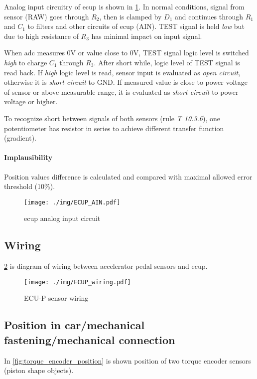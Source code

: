 Analog input circuitry of \gls{ecup} is shown in \ref{fig:ecup_analog_input}. In normal conditions, signal from sensor (RAW) goes through $R_2$, then is clamped by $D_1$ and continues through $R_1$ and $C_1$ to filters and other circuits of \gls{ecup} (AIN). TEST signal is held \textit{low} but due to high resistance of $R_3$ has minimal impact on input signal.

When \gls{adc} measures 0V or value close to 0V, TEST signal logic level is switched \textit{high} to charge $C_1$ through $R_3$. After short while, logic level of TEST signal is read back. If \textit{high} logic level is read, sensor input is evaluated as \textit{open circuit}, otherwise it is \textit{short circuit} to GND. If measured value is close to power voltage of sensor or above measurable range, it is evaluated as \textit{short circuit} to power voltage or higher.

To recognize short between signals of both sensors (rule \textit{T 10.3.6}), one potentiometer has resistor in series to achieve different transfer function (gradient). 

\paragraph{Implausibility}
Position values difference is calculated and compared with maximal allowed error threshold (10\%).

\begin{figure}[H]
\begin{center}
	\texttt{[image: ./img/ECUP\_AIN.pdf]}
	\caption{\gls{ecup} analog input circuit}
	\label{fig:ecup_analog_input}
\end{center}
\end{figure}



\subsection{Wiring}
\ref{fig:ecup_wiring} is diagram of wiring between accelerator pedal sensors and \gls{ecup}.

\begin{figure}[H]
\begin{center}
	\texttt{[image: ./img/ECUP\_wiring.pdf]}
	\caption{ECU-P sensor wiring}
	\label{fig:ecup_wiring}
\end{center}
\end{figure}

\subsection{Position in car/mechanical fastening/mechanical connection}
In \ref{fig:torque_encoder_position} is shown position of two torque encoder sensors (piston shape objects).

